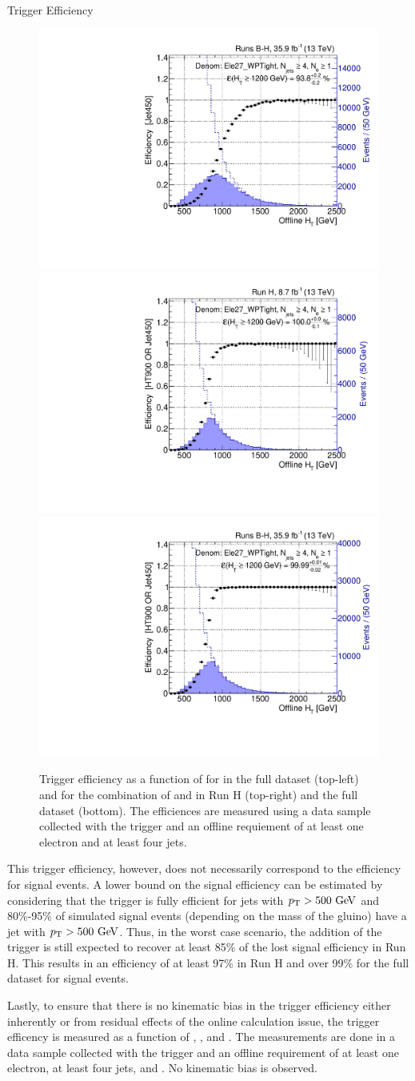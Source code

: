 \begin{section}{Trigger Efficiency}
\begin{figure}[tbp!]
\centering
\includegraphics[angle=0,width=0.45\columnwidth]{fig/trig_jet_runsbh.pdf}
\includegraphics[angle=0,width=0.45\columnwidth]{fig/trig_ht_jet_runh.pdf}
\includegraphics[angle=0,width=0.45\columnwidth]{fig/trig_ht_jet_runsbh.pdf}
\caption{Trigger efficiency as a function of \HT for \trigJet in the full dataset (top-left) and for the combination of \trigHT and \trigJet in Run H (top-right) and the full dataset (bottom).
The efficiences are measured using a data sample collected with the \trigEle trigger and an offline requiement of at least one electron and at least four jets.}
\label{fig:ht_jet_trigger}
\end{figure}

This trigger efficiency, however, does not necessarily correspond to the efficiency for signal events.
A lower bound on the signal efficiency can be estimated by considering that the \trigJet trigger is fully efficient for jets with $p_{\mathrm{T}} > 500~\mathrm{Ge\kern -0.1em V}$ and 80\%-95\% of simulated signal events (depending on the mass of the gluino) have a jet with $p_{\mathrm{T}} > 500~\mathrm{Ge\kern -0.1em V}$.
Thus, in the worst case scenario, the addition of the \trigJet trigger is still expected to recover at least 85\% of the lost signal efficiency in Run H.
This results in an efficiency of at least 97\% in Run H and over 99\% for the full dataset for signal events.

Lastly, to ensure that there is no kinematic bias in the trigger efficiency either inherently or from residual effects of the online \HT calculation issue, the trigger efficency is measured as a function of \MJ, \Njets, and \Nb.
The measurements are done in a data sample collected with the \trigEle trigger and an offline requirement of at least one electron, at least four jets, and \baseHT.
No kinematic bias is observed.

\end{section}

